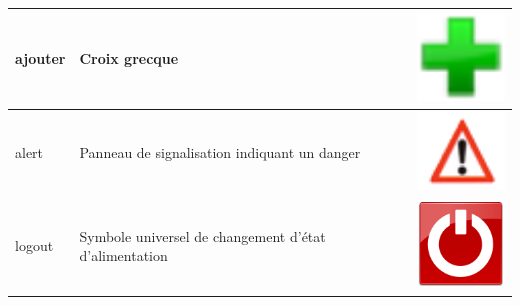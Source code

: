 \begin{longtable}{|m{3cm}|m{9cm}|m{2.5cm}|}
\hline
ajouter  & Croix grecque & \includegraphics[width=2.5cm]{img/ajouter.png} \\
\hline
alert  & Panneau de signalisation indiquant un danger & \includegraphics[width=2.5cm]{img/alert.png} \\
\hline
logout  & Symbole universel de changement d'état d'alimentation & \includegraphics[width=2.5cm]{img/logout.png} \\
\hline

\end{longtable}


